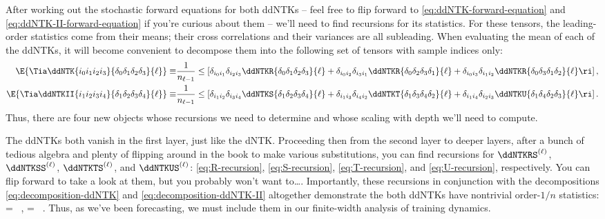 After working out the stochastic forward equations for both ddNTKs -- feel free to flip forward to \eqref{eq:ddNTK-forward-equation} and \eqref{eq:ddNTK-II-forward-equation} if you're curious about them -- we'll need to find recursions for its statistics. For these tensors, the leading-order statistics come from their means; their cross correlations and their variances are all subleading. When evaluating the mean of each of the ddNTKs,
it will become convenient to decompose them  into the following set of tensors with sample indices only:
\begin{align}\label{eq:decomposition-ddNTK}
\E{\Tia\ddNTK{i_0i_1i_2i_3}{\delta_0\delta_1\delta_2\delta_3}{\ell}} \equiv&\frac{1}{n_{\ell-1}}\le[\delta_{i_0i_1}\delta_{i_2i_3}\ddNTKR{\delta_0\delta_1\delta_2\delta_3}{\ell}+\delta_{i_0i_2}\delta_{i_3i_1}\ddNTKR{\delta_0\delta_2\delta_3\delta_1}{\ell}+\delta_{i_0i_3}\delta_{i_1i_2}\ddNTKR{\delta_0\delta_3\delta_1\delta_2}{\ell}\ri]\, , \\
\E{\Tia\ddNTKII{i_1i_2i_3i_4}{\delta_1\delta_2\delta_3\delta_4}{\ell}}\equiv&\frac{1}{n_{\ell-1}}\le[\delta_{i_1i_2}\delta_{i_3i_4}\ddNTKS{\delta_1\delta_2\delta_3\delta_4}{\ell}+\delta_{i_1i_3}\delta_{i_4i_2}\ddNTKT{\delta_1\delta_3\delta_4\delta_2}{\ell}+\delta_{i_1i_4}\delta_{i_2i_3}\ddNTKU{\delta_1\delta_4\delta_2\delta_3}{\ell}\ri]\, .
\label{eq:decomposition-ddNTK-II}
\end{align}
Thus, there are four new objects whose recursions we need to determine and whose  scaling with depth we'll need to compute.

The ddNTKs both vanish in the first layer, just like the dNTK. Proceeding then from the second layer to deeper layers,
after a bunch of tedious algebra and plenty of flipping around in the book to make various substitutions, you can find recursions for $\ddNTKRS^{(\ell)}$, $\ddNTKSS^{(\ell)}$, $\ddNTKTS^{(\ell)}$, and $\ddNTKUS^{(\ell)}$: \eqref{eq:R-recursion}, \eqref{eq:S-recursion}, \eqref{eq:T-recursion}, and \eqref{eq:U-recursion}, respectively. You can flip forward to take a look at them, but you probably won't want to\dots. Importantly, these recursions in conjunction with the decompositions \eqref{eq:decomposition-ddNTK} and \eqref{eq:decomposition-ddNTK-II} altogether demonstrate the both ddNTKs have nontrivial order-$1/n$ statistics:
\be
{} = \oninv\, ,\qquad {} = \oninv \, .
\ee
Thus, as we've been forecasting, we must include them in our finite-width analysis of training dynamics.


